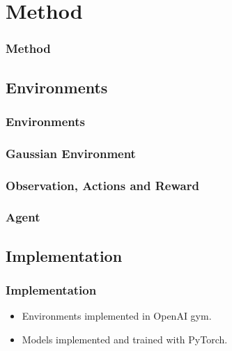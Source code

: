 \section{Method}

\begin{frame}
    \frametitle{Method}

\end{frame}

\subsection{Environments}

\begin{frame}
    \frametitle{Environments}
\end{frame}

\begin{frame}
    \frametitle{Gaussian Environment}
    \begin{figure}
        \centering
        
    \end{figure}
\end{frame}

\begin{frame}
    \frametitle{Observation, Actions and Reward}
\end{frame}

\begin{frame}
    \frametitle{Agent}
\end{frame}

\subsection{Implementation}

\begin{frame}
    \frametitle{Implementation}

    \begin{itemize}
        \item Environments implemented in OpenAI gym.
        \item Models implemented and trained with PyTorch.
    \end{itemize}
\end{frame}
